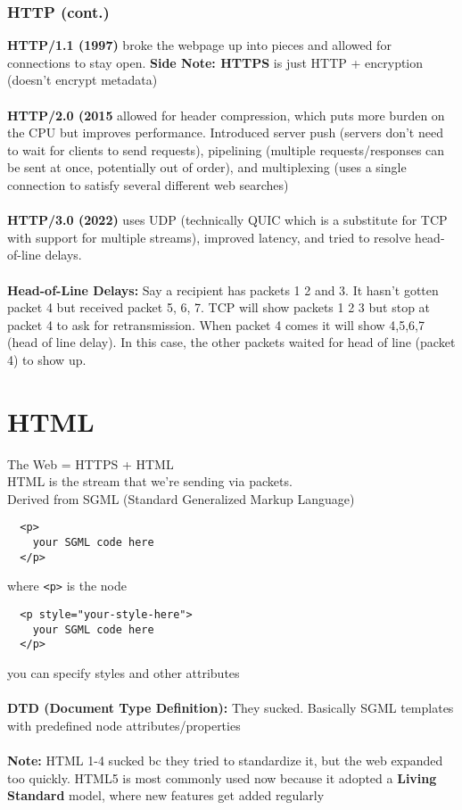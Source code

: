 \documentclass[13pt]{article}
\begin{document}
\subsubsection{HTTP (cont.)}
\textbf{HTTP/1.1 (1997)} broke the webpage up into pieces and allowed for connections to stay open.
\textbf{Side Note: HTTPS} is just HTTP + encryption (doesn't encrypt metadata) \\ \\
\textbf{HTTP/2.0 (2015} allowed for header compression, which puts more burden on the CPU but improves performance. Introduced server push (servers don't need to wait for clients to send requests), pipelining (multiple requests/responses can be sent at once, potentially out of order), and multiplexing (uses a single connection to satisfy several different web searches) \\ \\
\textbf{HTTP/3.0 (2022)} uses UDP (technically QUIC which is a substitute for TCP with support for multiple streams), improved latency, and tried to resolve head-of-line delays. \\ \\
\textbf{Head-of-Line Delays:} Say a recipient has packets 1 2 and 3. It hasn’t gotten packet 4 but received packet 5, 6, 7. TCP will show packets 1 2 3 but stop at packet 4 to ask for retransmission. When packet 4 comes it will show 4,5,6,7 (head of line delay). In this case, the other packets waited for head of line (packet 4) to show up.

\section{HTML}
The Web = HTTPS + HTML \\
HTML is the stream that we're sending via packets. \\
Derived from SGML (Standard Generalized Markup Language)
\begin{verbatim}
  <p>
    your SGML code here
  </p> \end{verbatim}
where \texttt{<p>} is the node
\begin{verbatim}
  <p style="your-style-here">
    your SGML code here
  </p> \end{verbatim}
you can specify styles and other attributes \\ \\
\textbf{DTD (Document Type Definition):} They sucked. Basically SGML templates with predefined node attributes/properties \\ \\
\textbf{Note:} HTML 1-4 sucked bc they tried to standardize it, but the web expanded too quickly. HTML5 is most commonly used now because it adopted a \textbf{Living Standard} model, where new features get added regularly
\end{document}
